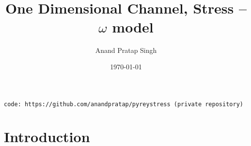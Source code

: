 \documentclass[%
notitlepage,
]{revtex4-1}
\begin{document}
\preprint{}

\title[]{One Dimensional Channel,  Stress -- $\omega$ model }%

\author{Anand Pratap Singh}
%

\date{\today}%

\begin{abstract}

\end{abstract}

\maketitle
\tableofcontents
\vspace{1cm}
\texttt{code: https://github.com/anandpratap/pyreystress (private repository)}
\section{Introduction}
\end{document}
